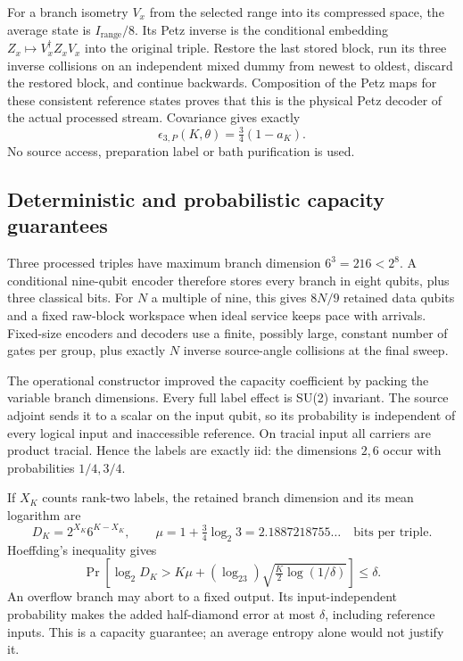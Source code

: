 For a branch isometry $V_x$ from the selected range into its compressed
space, the average state is $I_{\mathrm{range}}/8$. Its Petz inverse is
the conditional embedding $Z_x\mapsto V_x^\dagger Z_xV_x$ into the original
triple. Restore the last stored block, run its three inverse collisions on
an independent mixed dummy from newest to oldest, discard the restored
block, and continue backwards. Composition of the Petz maps for these
consistent reference states proves that this is the physical Petz decoder
of the actual processed stream. Covariance gives exactly
\begin{equation}
 \epsilon_{3,P}(K,\theta)=\tfrac34(1-a_K).\label{eq:tripleerror}
\end{equation}
No source access, preparation label or bath purification is used.

\subsection{Deterministic and probabilistic capacity guarantees}
Three processed triples have maximum branch dimension $6^3=216<2^8$.
A conditional nine-qubit encoder therefore stores every branch in eight
qubits, plus three classical bits. For $N$ a multiple of nine, this gives
$8N/9$ retained data qubits and a fixed raw-block workspace when ideal
service keeps pace with arrivals. Fixed-size encoders and decoders use a
finite, possibly large, constant number of gates per group, plus exactly
$N$ inverse source-angle collisions at the final sweep.

The operational constructor improved the capacity coefficient by packing
the variable branch dimensions. Every full label effect is SU(2) invariant.
The source adjoint sends it to a scalar on the input qubit, so its probability
is independent of every logical input and inaccessible reference. On tracial
input all carriers are product tracial. Hence the labels are exactly iid:
the dimensions $2,6$ occur with probabilities $1/4,3/4$.

If $X_K$ counts rank-two labels, the retained branch dimension and its mean
logarithm are
\[
 D_K=2^{X_K}6^{K-X_K},\qquad
 \mu=1+\tfrac34\log_2 3=2.1887218755\ldots\quad\text{bits per triple}.
\]
Hoeffding's inequality gives
\[
 \Pr\!\left[\log_2D_K>K\mu+
 (\log_23)\sqrt{\tfrac K2\log(1/\delta)}\right]\le\delta.
\]
An overflow branch may abort to a fixed output. Its input-independent
probability makes the added half-diamond error at most $\delta$, including
reference inputs. This is a capacity guarantee; an average entropy alone
would not justify it.

